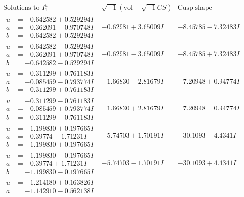 \documentclass[1p]{elsarticle_modified}
\theoremstyle{definition}
\newcommand{\I}{\sqrt{-1}}
\begin{document}
$$\begin{array}{c|c|c}  
\text{Solutions to }I^u_{1}& \I (\text{vol} + \sqrt{-1}CS) & \text{Cusp shape}\\
 \hline 
\begin{aligned}
u &= -0.642582 + 0.529294 I \\
a &= -0.362091 - 0.970748 I \\
b &= -0.642582 + 0.529294 I\end{aligned}
 & -0.62981 + 3.65009 I & -8.45785 - 7.32483 I \\ \hline\begin{aligned}
u &= -0.642582 - 0.529294 I \\
a &= -0.362091 + 0.970748 I \\
b &= -0.642582 - 0.529294 I\end{aligned}
 & -0.62981 - 3.65009 I & -8.45785 + 7.32483 I \\ \hline\begin{aligned}
u &= -0.311299 + 0.761183 I \\
a &= -0.085459 - 0.793774 I \\
b &= -0.311299 + 0.761183 I\end{aligned}
 & -1.66830 - 2.81679 I & -7.20948 + 0.94774 I \\ \hline\begin{aligned}
u &= -0.311299 - 0.761183 I \\
a &= -0.085459 + 0.793774 I \\
b &= -0.311299 - 0.761183 I\end{aligned}
 & -1.66830 + 2.81679 I & -7.20948 - 0.94774 I \\ \hline\begin{aligned}
u &= -1.199830 + 0.197665 I \\
a &= -0.39774 - 1.71231 I \\
b &= -1.199830 + 0.197665 I\end{aligned}
 & -5.74703 + 1.70191 I & -30.1093 - 4.4341 I \\ \hline\begin{aligned}
u &= -1.199830 - 0.197665 I \\
a &= -0.39774 + 1.71231 I \\
b &= -1.199830 - 0.197665 I\end{aligned}
 & -5.74703 - 1.70191 I & -30.1093 + 4.4341 I \\ \hline\begin{aligned}
u &= -1.214180 + 0.163826 I \\
a &= -1.142910 - 0.562138 I \\

\end{aligned}
\end{array}$$
\end{document}
